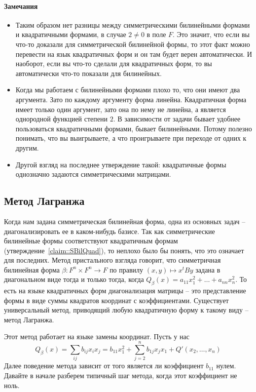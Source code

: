 \paragraph{Замечания}
\begin{itemize}
\item Таким образом нет разницы между симметрическими билинейными формами и квадратичными формами, в случае $2 \neq 0$ в поле $F$. Это значит, что если вы что-то доказали для симметрической билинейной формы, то этот факт можно перевести на язык квадратичных форм и он там будет верен автоматически. И наоборот, если вы что-то сделали для квадратичных форм, то вы автоматически что-то показали для билинейных.

\item Когда мы работаем с билинейными формами плохо то, что они имеют два аргумента. Зато по каждому аргументу форма линейна. Квадратичная форма имеет только один аргумент, зато она по нему не линейна, а является однородной функцией степени $2$. В зависимости от задачи бывает удобнее пользоваться квадратичными формами, бывает билинейными. Потому полезно понимать, что вы выигрываете, а что проигрываете при переходе от одних к другим.

\item Другой взгляд на последнее утверждение такой: квадратичные формы однозначно задаются симметрическими матрицами.

\end{itemize}


\subsection{Метод Лагранжа}

Когда нам задана симметрическая билинейная форма, одна из основных задач -- диагонализировать ее в каком-нибудь базисе. Так как симметрические билинейные формы соответствуют квадратичным формам (утверждение~\ref{claim::SBilQuad}), то неплохо было бы понять, что это означает для последних. Метод пристального взгляда говорит, что симметричная билинейная форма $\beta\colon F^n \times F^n \to F$ по правилу $(x, y)\mapsto x^t B y$ задана в диагональном виде тогда и только тогда, когда $Q_\beta(x) = a_{11}x_1^2 + \ldots + a_{nn}x_n^2$. То есть на языке квадратичных форм диагонализация матрицы -- это представление формы в виде суммы квадратов координат с коэффициентами. Существует универсальный метод, приводящий любую квадратичную форму к такому виду -- метод Лагранжа.


Этот метод работает на языке замены координат. Пусть у нас
\[
Q_\beta(x) = \sum_{ij}b_{ij}x_i x_j = b_{11}x_1^2 + \sum_{j=2}^n b_{1j}x_j x_1 + Q'(x_2,\ldots,x_n)
\]
Далее поведение метода зависит от того является ли коэффициент $b_{11}$ нулем. Давайте в начале разберем типичный шаг метода, когда этот коэффициент не ноль. 

